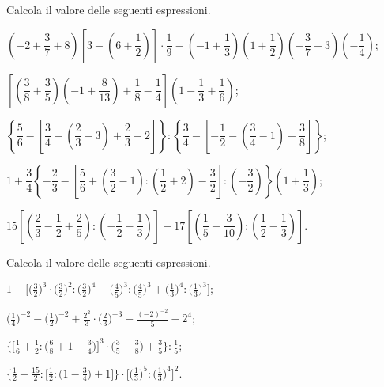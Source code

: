 \begin{esercizio}[\Ast]%
 Calcola il valore delle seguenti espressioni.
\begin{enumeratea}
\spazielenx
\item $\left(-2+\dfrac{3}{7}+8\right)\left[3-\left(6+\dfrac{1}{2}\right)\right]\cdot\dfrac{1}{9}-\left(-1+\dfrac{1}{3}\right)\left(1+\dfrac{1}{2}\right)\left(-\dfrac{3}{7}+3\right)\left(-\dfrac{1}{4}\right)$;
\item $\left[\left(\dfrac{3}{8}+\dfrac{3}{5}\right)\left(-1+\dfrac{8}{13}\right)+\dfrac{1}{8}-\dfrac{1}{4}\right]\left(1-\dfrac{1}{3}+\dfrac{1}{6}\right)$;
\item $\left\lbrace\dfrac{5}{6}-\left[\dfrac{3}{4}+\left(\dfrac{2}{3}-3\right)+\dfrac{2}{3}-2\right]\right\rbrace :
\left\lbrace\dfrac{3}{4}-\left[-\dfrac{1}{2}-\left(\dfrac{3}{4}-1\right)+\dfrac{3}{8}\right]\right\rbrace$;
\item $1+\dfrac{3}{4}\left\lbrace-\dfrac{2}{3}-\left[\dfrac{5}{6}+\left(\dfrac{3}{2}-1\right):\left(\dfrac{1}{2}+2\right)-\dfrac{3}{2}   \right]:\left(-\dfrac{3}{2}\right)\right\rbrace\left(1+\dfrac{1}{3}\right)$;
\item $15\left[\left(\dfrac{2}{3}-\dfrac{1}{2}+\dfrac{2}{5}\right):\left(-\dfrac{1}{2}-\dfrac{1}{3}\right)\right]
-17\left[\left(\dfrac{1}{5}-\dfrac{3}{10}\right):\left(\dfrac{1}{2}-\dfrac{1}{3}\right)\right]$.
\end{enumeratea}
\end{esercizio}

\begin{esercizio}[\Ast]%
Calcola il valore delle seguenti espressioni.
\begin{enumeratea}
\spazielenx
\item $\displaystyle{1-\bigg[\bigg(\frac{3}{2}\bigg)^{3}\cdot%
\bigg(\frac{3}{2}\bigg)^{2}:\bigg(\frac{3}{2}\bigg)^{4}-\bigg(\frac{4}{5}\bigg)^{3}:\bigg(\frac{4}{5}\bigg)^{3}+%
\bigg(\frac{1}{3}\bigg)^{4}:\bigg(\frac{1}{3}\bigg)^{3}\bigg]}$;
\item $\displaystyle{\bigg(\frac{1}{4}\bigg)^{-2}-\bigg(\frac{1}{2}\bigg)^{-2}+\frac{2^{2}}{3}\cdot%
\bigg(\frac{2}{3}\bigg)^{-3}-\frac{(-2)^{-2}}{5}-2^{4}}$;
\item $\displaystyle{\bigg\{\bigg[\frac{1}{6}+\frac{1}{2}:\bigg(\frac{6}{8}+1-\frac{3}{4}\bigg)\bigg]^{3}\cdot%
\bigg(\frac{3}{5}-\frac{3}{8}\bigg)+\frac{3}{5}\bigg\}:\frac{1}{5}}$;
\item $\displaystyle{\bigg\{\frac{1}{2}+\frac{15}{2}:\bigg[\frac{1}{2}:\bigg(1-\frac{3}{4}\bigg)+1\bigg]\bigg\}\cdot%
\bigg[\bigg(\frac{1}{3}\bigg)^{5}:\bigg(\frac{1}{3}\bigg)^{4}\bigg]^{2}}$.
\end{enumeratea}
\end{esercizio}

